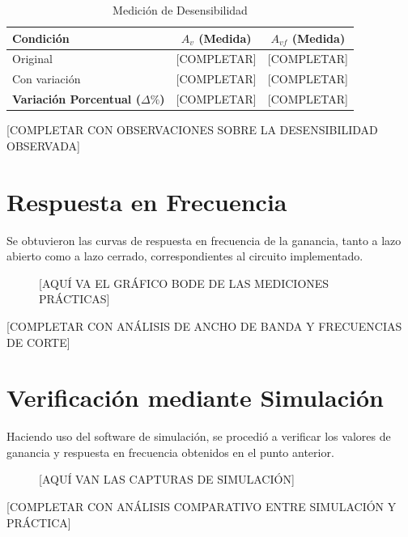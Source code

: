 \begin{table}[H]
    \centering
    \begin{tabular}{|l|c|c|}
        \hline
        \textbf{Condición} & \textbf{$A_v$ (Medida)} & \textbf{$A_{vf}$ (Medida)} \\ \hline
        Original & [COMPLETAR] & [COMPLETAR] \\ \hline
        Con variación & [COMPLETAR] & [COMPLETAR] \\ \hline
        \textbf{Variación Porcentual ($\Delta \%$)} & [COMPLETAR] & [COMPLETAR] \\ \hline
    \end{tabular}
    \caption{Medición de Desensibilidad}
    \label{tab:desensibilidad}
\end{table}

[COMPLETAR CON OBSERVACIONES SOBRE LA DESENSIBILIDAD OBSERVADA]

\section{Respuesta en Frecuencia}
Se obtuvieron las curvas de respuesta en frecuencia de la ganancia, tanto a lazo abierto como a lazo cerrado, correspondientes al circuito implementado.

\vspace{1cm}
\begin{figure}[H]
    \centering
    [AQUÍ VA EL GRÁFICO BODE DE LAS MEDICIONES PRÁCTICAS]
\end{figure}

[COMPLETAR CON ANÁLISIS DE ANCHO DE BANDA Y FRECUENCIAS DE CORTE]

\section{Verificación mediante Simulación}
Haciendo uso del software de simulación, se procedió a verificar los valores de ganancia y respuesta en frecuencia obtenidos en el punto anterior.

\vspace{1cm}
\begin{figure}[H]
    \centering
    [AQUÍ VAN LAS CAPTURAS DE SIMULACIÓN]
\end{figure}

[COMPLETAR CON ANÁLISIS COMPARATIVO ENTRE SIMULACIÓN Y PRÁCTICA]
